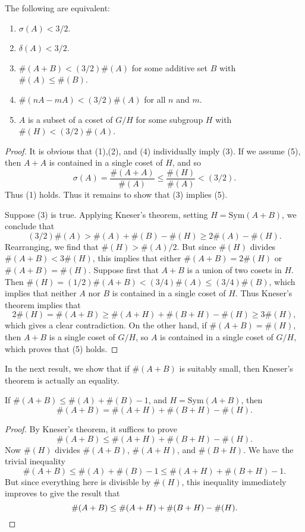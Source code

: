 \begin{corollary}
    The following are equivalent:
    \begin{enumerate}
        \item $\sigma(A) < 3/2$.
        \item $\delta(A) < 3/2$.
        \item $\#(A + B) < (3/2) \#(A)$ for some additive set $B$ with $\#(A) \leq \#(B)$.
        \item $\#(nA - mA) < (3/2) \#(A)$ for all $n$ and $m$.
        \item $A$ is a subset of a coset of $G/H$ for some subgroup $H$ with $\#(H) < (3/2) \#(A)$.
    \end{enumerate}
\end{corollary}
\begin{proof}
    It is obvious that (1),(2), and (4) individually imply (3). If we assume (5), then $A + A$ is contained in a single coset of $H$, and so
    \[ \sigma(A) = \frac{\#(A + A)}{\#(A)} \leq \frac{\#(H)}{\#(A)} < (3/2). \]
    Thus (1) holds. Thus it remains to show that (3) implies (5).

    Suppose (3) is true. Applying Kneser's theorem, setting $H = \text{Sym}(A+B)$, we conclude that
    \[ (3/2) \#(A) > \#(A) + \#(B) - \#(H) \geq 2 \#(A) - \#(H). \]
    Rearranging, we find that $\#(H) > \#(A) / 2$. But since $\#(H)$ divides $\#(A + B) < 3 \#(H)$, this implies that either $\#(A + B) = 2\#(H)$ or $\#(A + B) = \#(H)$. Suppose first that $A + B$ is a union of two cosets in $H$. Then $\#(H) = (1/2) \#(A + B) < (3/4) \#(A) \leq (3/4) \#(B)$, which implies that neither $A$ nor $B$ is contained in a single coset of $H$. Thus Kneser's theorem implies that
    \[ 2 \#(H) = \#(A + B) \geq \#(A + H) + \#(B + H) - \#(H) \geq 3\#(H), \]
    which gives a clear contradiction. On the other hand, if $\#(A + B) = \#(H)$, then $A + B$ is a single coset of $G/H$, so $A$ is contained in a single coset of $G/H$, which proves that (5) holds.
\end{proof}

In the next result, we show that if $\#(A + B)$ is suitably small, then Kneser's theorem is actually an equality. 

\begin{corollary}
    If $\#(A + B) \leq \#(A) + \#(B) - 1$, and $H = \text{Sym}(A + B)$, then
    \[ \#(A + B) = \#(A + H) + \#(B + H) - \#(H). \]
\end{corollary}
\begin{proof}
    By Kneser's theorem, it suffices to prove
    \[ \#(A + B) \leq \#(A + H) + \#(B + H) - \#(H). \]
    Now $\#(H)$ divides $\#(A + B)$, $\#(A + H)$, and $\#(B+H)$. We have the trivial inequality
    \[ \#(A + B) \leq \#(A) + \#(B) - 1 \leq \#(A + H) + \#(B + H) - 1. \]
    But since everything here is divisible by $\#(H)$, this inequality immediately improves to give the result that
    \[ \#(A + B) \leq \#(A + H) + \#(B + H) - \#(H). \qedhere \]
\end{proof}

